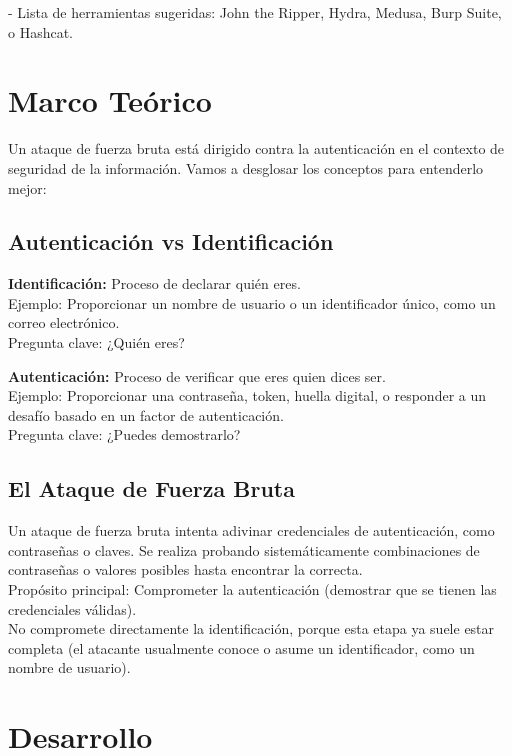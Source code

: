 \documentclass[12pt,a4paper]{article}
\begin{document}
- Lista de herramientas sugeridas: John the Ripper, Hydra, Medusa, Burp Suite, o Hashcat.


\section*{Marco Teórico}
Un ataque de fuerza bruta está dirigido contra la autenticación en el contexto de seguridad de la información. Vamos a desglosar los conceptos para entenderlo mejor:

\subsection{Autenticación vs Identificación}
\textbf{Identificación:} Proceso de declarar quién eres. \\
Ejemplo: Proporcionar un nombre de usuario o un identificador único, como un correo electrónico. \\
Pregunta clave: ¿Quién eres?

\textbf{Autenticación:} Proceso de verificar que eres quien dices ser. \\
Ejemplo: Proporcionar una contraseña, token, huella digital, o responder a un desafío basado en un factor de autenticación. \\
Pregunta clave: ¿Puedes demostrarlo?

\subsection*{El Ataque de Fuerza Bruta}
Un ataque de fuerza bruta intenta adivinar credenciales de autenticación, como contraseñas o claves. Se realiza probando sistemáticamente combinaciones de contraseñas o valores posibles hasta encontrar la correcta. \\
Propósito principal: Comprometer la autenticación (demostrar que se tienen las credenciales válidas). \\
No compromete directamente la identificación, porque esta etapa ya suele estar completa (el atacante usualmente conoce o asume un identificador, como un nombre de usuario).

\section{Desarrollo}
\end{document}
